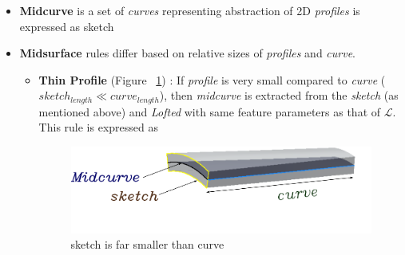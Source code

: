 \begin{itemize}[noitemsep,topsep=2pt,parsep=2pt,partopsep=2pt,label={},leftmargin=*]

\item {\bf Midcurve} is a set of {\em curves} representing abstraction of 2D {\em profiles} is expressed as 	 {sketch} 

\item {\bf Midsurface} rules differ based on relative sizes of {\em profiles} and {\em curve}.
\begin{itemize}
\item {\bf Thin Profile} (Figure ~\ref{figure_MidsurfSmallProfile}) : If {\em profile} is very small compared to {\em curve} ( $sketch_{length} \ll curve_{length}$), then {\em midcurve} is extracted from the {\em sketch} (as mentioned above) and {\em Lofted} with same feature parameters as that of  {\bf $\mathcal{L}$}. This rule is expressed as  

\begin{figure}[htbp]
\begin{center}
\includegraphics[scale=0.40]{../Common/images//MidsurfSmallProfile.pdf} 
\end{center}

\caption{sketch is far smaller than curve}
\label{figure_MidsurfSmallProfile}
\end{figure}


\end{itemize}
\end{itemize}
